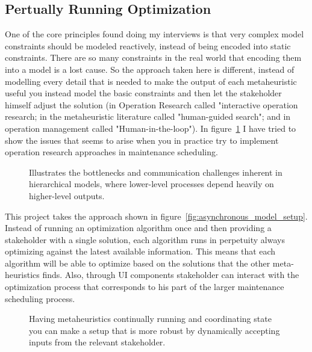 \subsection*{Pertually Running Optimization}
One of the core principles found doing my interviews is that very complex model constraints should be modeled reactively, instead 
of being encoded into static constraints. There are so many constraints in the real world that 
encoding them into a model is a lost cause. So the approach taken here is different, instead of modelling every
detail that is needed to make the output of each metaheuristic useful you instead model the basic constraints and then let 
the stakeholder himself adjust the solution (in Operation Research called "interactive operation research; in the metaheuristic literature called
"human-guided search"; and in operation management called "Human-in-the-loop"). In figure~\ref{fig:model-setup:classic-hierarchical} I have tried to show the issues 
that seems to arise when you in practice try to implement operation research approaches in maintenance scheduling.

\begin{figure}[H]
	\centering
	
	\caption{
		Illustrates the bottlenecks and communication challenges inherent in hierarchical models, where lower-level processes depend heavily on higher-level outputs.
	}
	\label{fig:model-setup:classic-hierarchical}
\end{figure}

This project takes the approach shown in figure~\ref{fig:asynchronous_model_setup}. 
Instead of running an optimization algorithm once and then providing a stakeholder with a single 
solution, each algorithm runs in perpetuity always optimizing against the latest available information. This means that each algorithm will
be able to optimize based on the solutions that the other meta-heuristics finds. Also, through UI components stakeholder can interact with the
optimization process that corresponds to his part of the larger maintenance scheduling process. 

\begin{figure}[H]
	\centering
	
	\caption{
		Having metaheuristics continually running and coordinating state you can make a setup that is more robust by dynamically accepting inputs from the relevant stakeholder.  
	}
	\label{
		fig:asynchronous_model_setup
	}
\end{figure}

